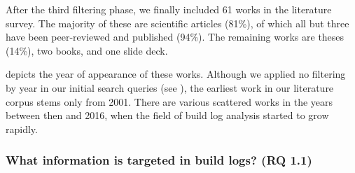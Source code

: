 After the third filtering phase, we finally included 61 works in the
literature survey.
The majority of these are scientific articles (81\%), of which all but
three have been peer-reviewed and published (94\%).
The remaining works are theses (14\%), two books, and one slide deck.

 depicts the year of appearance of these
works.
Although we applied no filtering by year in our initial search queries
(see ), the earliest work in our literature corpus
stems only from 2001.
There are various scattered works in the years between then and 2016,
when the field of build log analysis started to grow rapidly.


\subsubsection{What information is targeted in build logs? (RQ 1.1)}
\label{sec:rq11}
